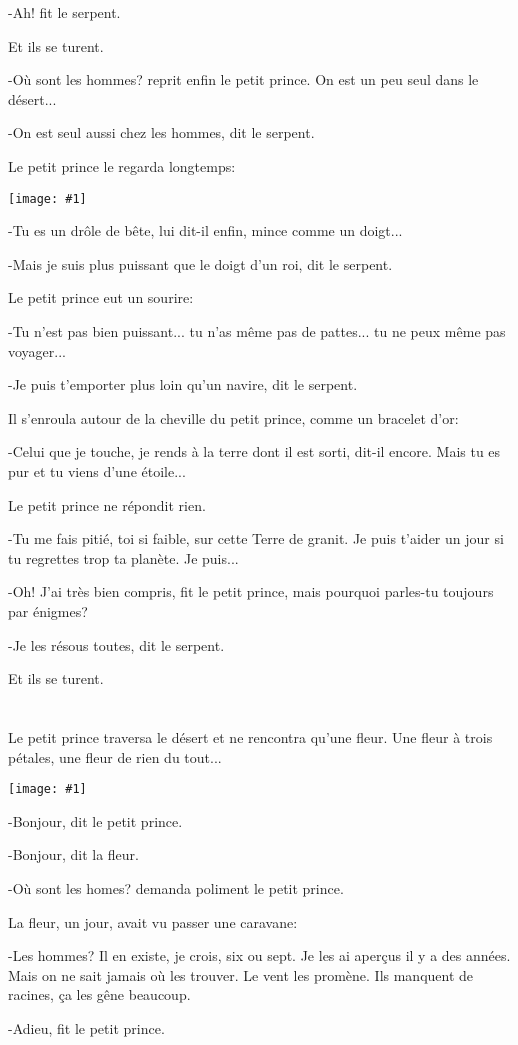 \documentclass{report}
\newcommand{\parachapter}[2][]{\chapter[#1]{#2}}
\newcommand{\incpic}[1]{%
\begin{center}
    \texttt{[image: \#1]}
\end{center}%
}
\begin{document}
-Ah! fit le serpent.

Et ils se turent.

-Où sont les hommes? reprit enfin le petit prince. On est un peu seul dans le désert...

-On est seul aussi chez les hommes, dit le serpent.

Le petit prince le regarda longtemps:

\incpic{pic/image33.jpeg}

-Tu es un drôle de bête, lui dit-il enfin, mince comme un doigt...

-Mais je suis plus puissant que le doigt d'un roi, dit le serpent.

Le petit prince eut un sourire:

-Tu n'est pas bien puissant... tu n'as même pas de pattes... tu ne peux même pas voyager...

-Je puis t'emporter plus loin qu'un navire, dit le serpent.

Il s'enroula autour de la cheville du petit prince, comme un bracelet d'or:

-Celui que je touche, je rends à la terre dont il est sorti, dit-il encore. Mais tu es pur et tu viens d'une étoile...

Le petit prince ne répondit rien.

-Tu me fais pitié, toi si faible, sur cette Terre de granit. Je puis t'aider un jour si tu regrettes trop ta planète. Je puis...

-Oh! J'ai très bien compris, fit le petit prince, mais pourquoi parles-tu toujours par énigmes?

-Je les résous toutes, dit le serpent.

Et ils se turent.
\parachapter{} %
Le petit prince traversa le désert et ne rencontra qu'une fleur. Une fleur à trois pétales, une fleur de rien du tout...

\incpic{pic/image34.jpeg}

-Bonjour, dit le petit prince.

-Bonjour, dit la fleur.

-Où sont les homes? demanda poliment le petit prince.

La fleur, un jour, avait vu passer une caravane:

-Les hommes? Il en existe, je crois, six ou sept. Je les ai aperçus il y a des années. Mais on ne sait jamais où les trouver. Le vent les promène. Ils manquent de racines, ça les gêne beaucoup.

-Adieu, fit le petit prince.
\end{document}
